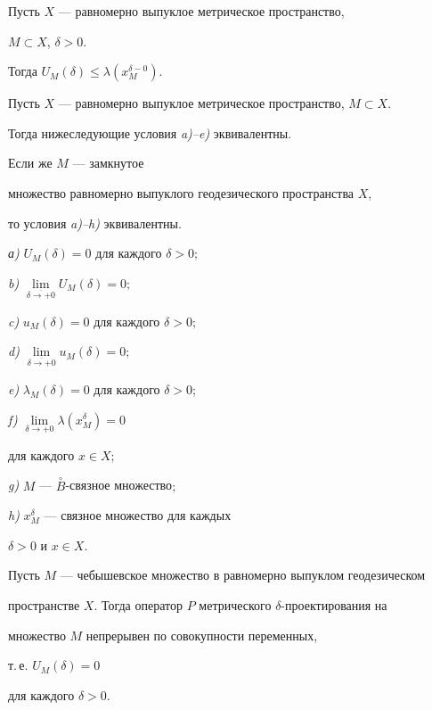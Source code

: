 \begin{thm}


Пусть $X$ --- равномерно выпуклое метрическое пространство,


$M \subset X$, $\delta > 0$.


Тогда $U_{M}(\delta ) \leq \lambda (x_{M}^{ \delta - 0})$.


\end{thm}





\begin{thm}


Пусть $X$ --- равномерно выпуклое метрическое пространство, $M\subset X$.


Тогда нижеследующие условия {\em a)--e)} эквивалентны.


Если же $M$ --- замкнутое 


множество равномерно выпуклого геодезического пространства $X$,


то условия {\em a)--h)} эквивалентны.





{\em а)} $U_{M}(\delta ) = 0$ для каждого $\delta > 0;$


{\em b)} $\lim \limits_{\overline{\delta \to +0}}{U_{M}(\delta )} = 0;$


 


{\em c)} $u_{M}(\delta ) = 0$ для каждого $\delta > 0;$ 


{\em d)} $\lim \limits_{\overline{\delta \to +0}}{u_{M}(\delta )} = 0;$





{\em e)} $\lambda _{M}(\delta) = 0$ для каждого $\delta > 0;$ 


{\em f)} $\lim \limits_{\delta \to +0}{\lambda (x_{M}^{ \delta})} = 0$


для каждого $x \in X;$





{\em g)} $M$ --- $\overset{\circ}{B}$-связное множество$;$ 


{\em h)} $x_{M}^{ \delta}$ --- связное множество для каждых


$\delta > 0$ и $x \in X$.


\end{thm}





\begin{cor}


Пусть $M$ --- чебышевское множество в равномерно выпуклом геодезическом


пространстве $X$. Тогда оператор $P$ метрического $\delta$-проектирования на


множество $M$ непрерывен по совокупности переменных,


т.\,е. $U_{M}(\delta ) = 0$


для каждого $\delta > 0$.


\end{cor}





